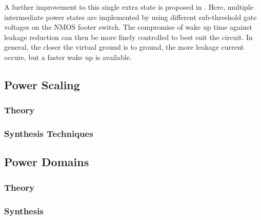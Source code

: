 A further improvement to this single extra state is proposed in \cite{singh2007enhanced}. 
Here, multiple intermediate power states are implemented by using different sub-threshold gate voltages on the NMOS footer switch. 
The compromise of wake up time against leakage reduction can then be more finely controlled to best suit the circuit.
In general, the closer the virtual ground is to ground, the more leakage current occurs, but a faster wake up is available. 

\subsection{Power Scaling}


\subsubsection{Theory}


\subsubsection{Synthesis Techniques}


\subsection{Power Domains}

\subsubsection{Theory}

\subsubsection{Synthesis}